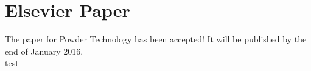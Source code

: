
\section{Elsevier Paper}
\label{sec:elsevierpaper}

The paper for Powder Technology has been accepted!
It will be published by the end of January 2016.\\
test\\
















